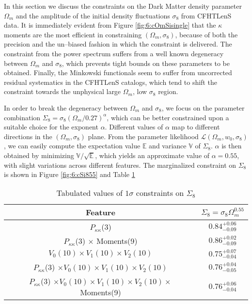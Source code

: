 In this section we discuss the constraints on the Dark Matter density parameter $\Omega_m$ and the amplitude of the initial density fluctuations $\sigma_8$ from CFHTLenS data. It is immediately evident from Figure \ref{fig:6:cOmSisingle} that the $\kappa$ moments are the most efficient in constraining $(\Omega_m,\sigma_8)$, because of both the precision and the un--biased fashion in which the constraint is delivered. The constraint from the power spectrum suffers from a well known degeneracy between $\Omega_m$ and $\sigma_8$, which prevents tight bounds on these parameters to be obtained. Finally, the Minkowski functionals seem to suffer from uncorrected residual systematics in the CFHTLenS catalogs, which tend to shift the constraint towards the unphysical large $\Omega_m$, low $\sigma_8$ region. 

In order to break the degeneracy between $\Omega_m$ and $\sigma_8$, we focus on the parameter combination $\Sigma_8=\sigma_8(\Omega_m/0.27)^\alpha$, which can be better constrained upon a suitable choice for the exponent $\alpha$. Different values of $\alpha$ map to different directions in the $(\Omega_m,\sigma_8)$ plane. From the parameter likelihood $\mathcal{L}(\Omega_m,w_0,\sigma_8)$, we can easily compute the expectation value $\mathds{E}$ and variance $\mathds{V}$ of $\Sigma_8$. $\alpha$ is then obtained by minimizing $\mathds{V}/\sqrt{\mathds{E}}$, which yields an approximate value of $\alpha=0.55$, with slight variations across different features. The marginalized constraint on $\Sigma_8$ is shown in Figure \ref{fig:6:cSi855} and Table \ref{tab:6:Si8}
%
\begin{table}
\begin{center}
\begin{tabular}{c|c}
\textbf{Feature} & $\Sigma_8=\sigma_8\Omega_m^{0.55}$ \\ \hline \hline
$P_{\kappa\kappa}$(3) & $0.84^{+0.06}_{-0.09}$\\
$P_{\kappa\kappa}$(3) $\times$ Moments(9) & $0.86^{+0.02}_{-0.09}$ \\
$V_0(10)\times V_1(10) \times V_2(10)$  & $0.75^{+0.07}_{-0.04}$ \\
$P_{\kappa\kappa}$(3) $\times V_0(10)\times V_1(10) \times V_2(10)$ & $0.76^{+0.04}_{-0.05}$ \\
$P_{\kappa\kappa}$(3) $\times V_0(10)\times V_1(10) \times V_2(10) \times$ Moments(9) & $0.76^{+0.06}_{-0.04}$ \\ \hline
\end{tabular}
\end{center}
\caption{Tabulated values of $1\sigma$ constraints on $\Sigma_8$}
\label{tab:6:Si8}
\end{table}    

